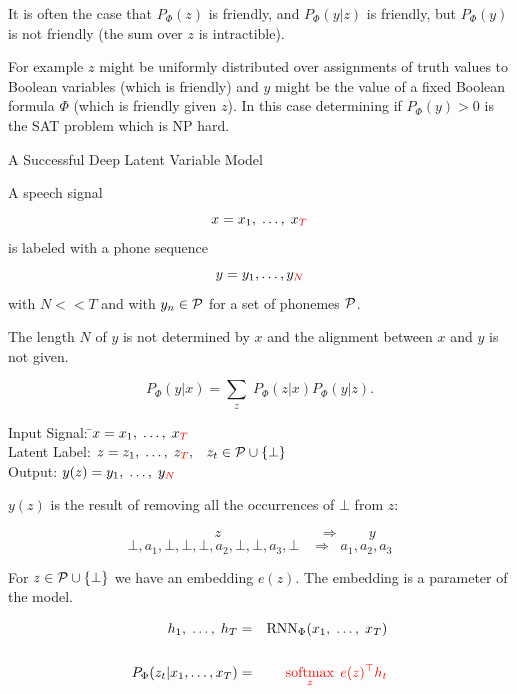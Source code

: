 {\vfill
It is often the case that $P_\Phi(z)$ is friendly, and $P_\Phi(y|z)$ is friendly, but $P_\Phi(y)$ is not friendly (the sum over $z$ is intractible).

\vfill
For example $z$ might be uniformly distributed over assignments of truth values to Boolean variables (which is friendly) and $y$ might be the value of a fixed Boolean formula $\Phi$ (which is friendly given $z$).  In this case
determining if $P_\Phi(y) > 0$ is the SAT problem which is NP hard.

{A Successful Deep Latent Variable Model}

A speech signal
$$x = x_1,\; \ldots,\; x_{\color{red} T}$$
is labeled with a phone sequence
$$y = y_1, \ldots, y_{\color{red} N}$$
with {\color{red} $N << T$} and with $y_n \in {\cal P}$ for a set of phonemes ${\cal P}$.

\vfill
{\color{red} The length $N$ of $y$ is not determined by $x$ and the alignment between $x$ and $y$ is not given.}


{\color{red} $$P_\Phi(y|x) = \sum_z\;P_\Phi(z|x)P_\Phi(y|z).$$}

\vfill
\begin{tabbing}
Input Signal: \hspace{3em} \=$x = x_1,\;\ldots,\;x_{\color{red} T}$ \\
Latent Label: \>$z = z_1,\;\ldots,\;z_{\color{red} T},\;\;\;z_t \in {\cal P} \cup \{\bot\}$ \\
Output: \>$y(z) = y_1,\;\ldots,\;y_{\color{red} N}$
\end{tabbing}

\vfill
$y(z)$ is the result of removing all the occurrences of $\bot$ from $z$:

{\color{red} $$\hspace{5em} z \hspace{7em} \Rightarrow \hspace{2em} y$$}
{\color{red} $$\bot,a_1,\bot,\bot,\bot,a_2,\bot,\bot,a_3,\bot \;\;\;\Rightarrow\;\; a_1,a_2,a_3$$}



For $z \in {\cal P} \cup \{\bot\}$ we have an embedding $e(z)$.  The embedding is a parameter of the model.

\begin{eqnarray*}
  h_1,\;\ldots,\;h_T & = & \mathrm{RNN}_\Phi(x_1,\;\ldots,\;x_T) \\
  \\
  P_\Phi(z_t|x_1,\ldots,x_T) & = & {\color{red} \operatorname*{softmax}_{z} \;e(z)^\top h_t}
\end{eqnarray*}

}
